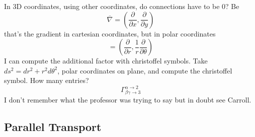  In 3D coordinates, using other coordinates, do connections have to be 0? Be
 \[
 \overline{\nabla } = \left( \frac{\partial }{\partial x} , \frac{\partial }{\partial y}  \right)
 \]
 that's the gradient in cartesian coordinates, but in polar coordinates
 \[
 = \left( \frac{\partial }{\partial r} , \frac{1}{r} \frac{\partial }{\partial \theta }  \right)
 \]
 I can compute the additional factor with christoffel symbols.
 Take $ds^{2} = dr^{2} + r^{2}d\theta ^{2}$, polar coordinates on plane, and compute the christoffel symbol. How many entries?
 \[
 \Gamma ^{\alpha \to 2}_{\beta \gamma \to 3} 
 \]
 I don't remember what the professor was trying to say but in doubt see Carroll.

 \subsection{Parallel Transport}
 



